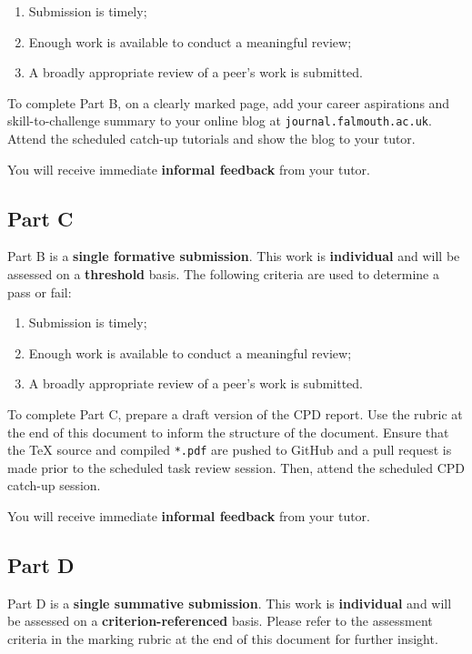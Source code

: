 \documentclass{../../fal_assignment}
\begin{document}
\begin{enumerate}[label=(\alph*)]
	\item Submission is timely;
	\item Enough work is available to conduct a meaningful review;
	\item A broadly appropriate review of a peer's work is submitted.
\end{enumerate}

To complete Part B, on a  clearly marked page, add your career aspirations and skill-to-challenge summary to your online blog at \texttt{journal.falmouth.ac.uk}. Attend the scheduled catch-up tutorials and show the blog to your tutor. 

You will receive immediate \textbf{informal feedback} from your tutor.

\subsection*{Part C}

Part B is a \textbf{single formative submission}. This work is \textbf{individual} and will be assessed on a \textbf{threshold} basis. The following criteria are used to determine a pass or fail:

\begin{enumerate}[label=(\alph*)]
	\item Submission is timely;
	\item Enough work is available to conduct a meaningful review;
	\item A broadly appropriate review of a peer's work is submitted.
\end{enumerate}

To complete Part C, prepare a draft version of the CPD report. Use the rubric at the end of this document to inform the structure of the document. Ensure that the TeX source and compiled \texttt{*.pdf} are pushed to GitHub and a pull request is made prior to the scheduled task review session. Then, attend the scheduled CPD catch-up session.

You will receive immediate \textbf{informal feedback} from your tutor.

\subsection*{Part D}

Part D is a \textbf{single summative submission}. This work is \textbf{individual} and will be assessed on a \textbf{criterion-referenced} basis. Please refer to the assessment criteria in the marking rubric at the end of this document for further insight.
\end{document}
